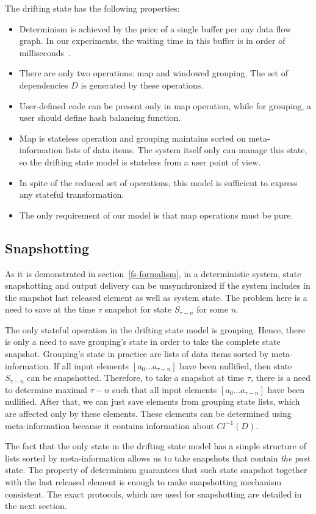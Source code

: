 The drifting state has the following properties:
\begin{itemize}
    \item Determinism is achieved by the price of a single buffer per any data flow graph. In our experiments, the waiting time in this buffer is in order of milliseconds~\cite{we2018adbis}.
    \item There are only two operations: map and windowed grouping. The set of dependencies $D$ is generated by these operations.
    \item User-defined code can be present only in map operation, while for grouping, a user should define hash balancing function.
    \item Map is stateless operation and grouping maintains sorted on meta-information lists of data items. The system itself only can manage this state, so the drifting state model is stateless from a user point of view.
    \item In spite of the reduced set of operations, this model is sufficient to express any stateful transformation.
    \item The only requirement of our model is that map operations must be pure.
\end{itemize}

\subsection{Snapshotting}

As it is demonstrated in section~\ref{fs-formalism}, in a deterministic system, state snapshotting and output delivery can be unsynchronized if the system includes in the snapshot last released element as well as system state. The problem here is a need to save at the time $\tau$ snapshot for state $S_{\tau-n}$ for some $n$.

The only stateful operation in the drifting state model is grouping. Hence, there is only a need to save grouping's state in order to take the complete state snapshot. Grouping's state in practice are lists of data items sorted by meta-information. If all input elements $[a_{0}...a_{\tau-n}]$ have been nullified, then state $S_{\tau-n}$ can be snapshotted. Therefore, to take a snapshot at time $\tau$, there is a need to determine maximal $\tau-n$ such that all input elements $[a_{0}...a_{\tau-n}]$ have been nullified. After that, we can just save elements from grouping state lists, which are affected only by these elements. These elements can be determined using meta-information because it contains information about $Cl^{-1}(D)$.

The fact that the only state in the drifting state model has a simple structure of lists sorted by meta-information allows us to take snapshots that contain {\em the past} state. The property of determinism guarantees that such state snapshot together with the last released element is enough to make snapshotting mechanism consistent. The exact protocols, which are used for snapshotting are detailed in the next section.  